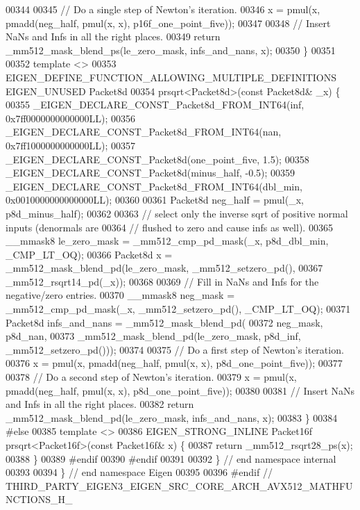 \begin{DoxyCode}
00344 
00345   \textcolor{comment}{// Do a single step of Newton's iteration.}
00346   x = pmul(x, pmadd(neg\_half, pmul(x, x), p16f\_one\_point\_five));
00347 
00348   \textcolor{comment}{// Insert NaNs and Infs in all the right places.}
00349   \textcolor{keywordflow}{return} \_mm512\_mask\_blend\_ps(le\_zero\_mask, infs\_and\_nans, x);
00350 \}
00351 
00352 \textcolor{keyword}{template} <>
00353 EIGEN\_DEFINE\_FUNCTION\_ALLOWING\_MULTIPLE\_DEFINITIONS EIGEN\_UNUSED Packet8d
00354 prsqrt<Packet8d>(\textcolor{keyword}{const} Packet8d& \_x) \{
00355   \_EIGEN\_DECLARE\_CONST\_Packet8d\_FROM\_INT64(inf, 0x7ff0000000000000LL);
00356   \_EIGEN\_DECLARE\_CONST\_Packet8d\_FROM\_INT64(nan, 0x7ff1000000000000LL);
00357   \_EIGEN\_DECLARE\_CONST\_Packet8d(one\_point\_five, 1.5);
00358   \_EIGEN\_DECLARE\_CONST\_Packet8d(minus\_half, -0.5);
00359   \_EIGEN\_DECLARE\_CONST\_Packet8d\_FROM\_INT64(dbl\_min, 0x0010000000000000LL);
00360 
00361   Packet8d neg\_half = pmul(\_x, p8d\_minus\_half);
00362 
00363   \textcolor{comment}{// select only the inverse sqrt of positive normal inputs (denormals are}
00364   \textcolor{comment}{// flushed to zero and cause infs as well).}
00365   \_\_mmask8 le\_zero\_mask = \_mm512\_cmp\_pd\_mask(\_x, p8d\_dbl\_min, \_CMP\_LT\_OQ);
00366   Packet8d x = \_mm512\_mask\_blend\_pd(le\_zero\_mask, \_mm512\_setzero\_pd(),
00367                                     \_mm512\_rsqrt14\_pd(\_x));
00368 
00369   \textcolor{comment}{// Fill in NaNs and Infs for the negative/zero entries.}
00370   \_\_mmask8 neg\_mask = \_mm512\_cmp\_pd\_mask(\_x, \_mm512\_setzero\_pd(), \_CMP\_LT\_OQ);
00371   Packet8d infs\_and\_nans = \_mm512\_mask\_blend\_pd(
00372       neg\_mask, p8d\_nan,
00373       \_mm512\_mask\_blend\_pd(le\_zero\_mask, p8d\_inf, \_mm512\_setzero\_pd()));
00374 
00375   \textcolor{comment}{// Do a first step of Newton's iteration.}
00376   x = pmul(x, pmadd(neg\_half, pmul(x, x), p8d\_one\_point\_five));
00377 
00378   \textcolor{comment}{// Do a second step of Newton's iteration.}
00379   x = pmul(x, pmadd(neg\_half, pmul(x, x), p8d\_one\_point\_five));
00380 
00381   \textcolor{comment}{// Insert NaNs and Infs in all the right places.}
00382   \textcolor{keywordflow}{return} \_mm512\_mask\_blend\_pd(le\_zero\_mask, infs\_and\_nans, x);
00383 \}
00384 \textcolor{preprocessor}{#else}
00385 \textcolor{keyword}{template} <>
00386 EIGEN\_STRONG\_INLINE Packet16f prsqrt<Packet16f>(\textcolor{keyword}{const} Packet16f& x) \{
00387   \textcolor{keywordflow}{return} \_mm512\_rsqrt28\_ps(x);
00388 \}
00389 \textcolor{preprocessor}{#endif}
00390 \textcolor{preprocessor}{#endif}
00391 
00392 \}  \textcolor{comment}{// end namespace internal}
00393 
00394 \}  \textcolor{comment}{// end namespace Eigen}
00395 
00396 \textcolor{preprocessor}{#endif  // THIRD\_PARTY\_EIGEN3\_EIGEN\_SRC\_CORE\_ARCH\_AVX512\_MATHFUNCTIONS\_H\_}
\end{DoxyCode}
